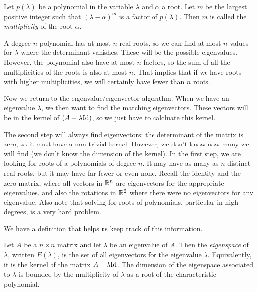 \documentclass[fleqn]{report}
\begin{document}
\begin{defn}
Let $p(\lambda)$ be a polynomial in the variable $\lambda$ and
$\alpha$ a root. Let $m$ be the largest positive integer such
that $(\lambda - \alpha)^m$ is a factor of $p(\lambda)$. Then
$m$ is called the \emph{multiplicity} of the root $\alpha$. 
\end{defn}

A degree $n$ polynomial has at most $n$ real roots, so we can
find at most $n$ values for $\lambda$ where the determinant
vanishes. These will be the possible eigenvalues. However,
the polynomial also have at most $n$ factors, so the sum of
all the multiplicities of the roots is also at most $n$. That
implies that if we have roots with higher multiplicities, we
will certainly have fewer than $n$ roots. 

Now we return to the eigenvalue/eigenvector algorithm. When
we have an eigenvalue $\lambda$, we then want to find the
matching eigenvectors. These vectors will be in the kernel of
$(A - \lambda \mathrm{Id})$, so we just have to calcluate this kernel.

The second step will always find eigenvectors: the
determinant of the matrix is zero, so it must have a
non-trivial kernel. However, we don't know now many we will
find (we don't know the dimension of the kernel). In the first
step, we are looking for roots of a polynomials of degree $n$.
It may have as many as $n$ distinct real roots, but it may
have far fewer or even none. Recall the identity and the zero
matrix, where all vectors in $\mathbb{R}^n$ are eigenvectors for the
appropriate eigenvalues, and also the rotations in $\mathbb{R}^2$
where there were no eigenvectors for any eigenvalue. Also
note that solving for roots of polynomials, particular in high
degrees, is a very hard problem. 

We have a definition that helps us keep track of this
information.

\begin{defn}
Let $A$ be a $n \times n$ matrix and let $\lambda$ be an
eigenvalue of $A$. Then the \emph{eigenspace} of $\lambda$,
written $E(\lambda)$, is the set of all eigenvectors for the
eigenvalue $\lambda$. Equivalently, it is the kernel of the
matrix $A - \lambda \mathrm{Id}$. The dimension of the eigenspace
associated to $\lambda$ is bounded by the multiplicity of
$\lambda$ as a root of the characteristic polynomial.
\end{defn}
\end{document}
